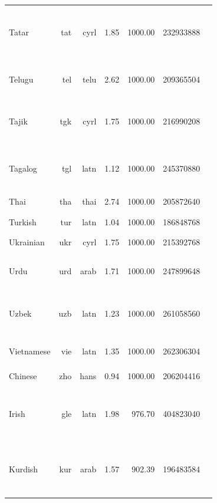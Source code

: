 \documentclass[11pt]{article}
\begin{document}
\begin{center}
\begin{longtable}[width=0.9\textwidth]{|lrrrrrl|}
Tatar & tat & cyrl & 1.85 & 1000.00 & 232933888 & {\color{oscar}\rule{0.4cm}{8pt}}{\color{nllb}\rule{0.49cm}{8pt}}{\color{madlad400}\rule{1.72cm}{8pt}}{\color{glot500}\rule{1.14cm}{8pt}}{\color{other}\rule{0.25cm}{8pt}} \\ 
Telugu & tel & telu & 2.62 & 1000.00 & 209365504 & {\color{oscar}\rule{0.74cm}{8pt}}{\color{glot500}\rule{3.24cm}{8pt}}{\color{other}\rule{0.019999999999999574cm}{8pt}} \\ 
Tajik & tgk & cyrl & 1.75 & 1000.00 & 216990208 & {\color{oscar}\rule{0.38cm}{8pt}}{\color{nllb}\rule{0.53cm}{8pt}}{\color{madlad400}\rule{2.99cm}{8pt}}{\color{other}\rule{0.09999999999999964cm}{8pt}} \\ 
Tagalog & tgl & latn & 1.12 & 1000.00 & 245370880 & {\color{oscar}\rule{0.9cm}{8pt}}{\color{nllb}\rule{1.07cm}{8pt}}{\color{glot500}\rule{2.01cm}{8pt}}{\color{other}\rule{0.020000000000000018cm}{8pt}} \\ 
Thai & tha & thai & 2.74 & 1000.00 & 205872640 & {\color{oscar}\rule{4.0cm}{8pt}}{\color{other}\rule{0.0cm}{8pt}} \\ 
Turkish & tur & latn & 1.04 & 1000.00 & 186848768 & {\color{oscar}\rule{4.0cm}{8pt}}{\color{other}\rule{0.0cm}{8pt}} \\ 
Ukrainian & ukr & cyrl & 1.75 & 1000.00 & 215392768 & {\color{oscar}\rule{4.0cm}{8pt}}{\color{other}\rule{0.0cm}{8pt}} \\ 
Urdu & urd & arab & 1.71 & 1000.00 & 247899648 & {\color{oscar}\rule{1.43cm}{8pt}}{\color{nllb}\rule{1.52cm}{8pt}}{\color{glot500}\rule{1.05cm}{8pt}}{\color{other}\rule{0.0cm}{8pt}} \\ 
Uzbek & uzb & latn & 1.23 & 1000.00 & 261058560 & {\color{oscar}\rule{0.03cm}{8pt}}{\color{madlad400}\rule{3.06cm}{8pt}}{\color{glot500}\rule{0.62cm}{8pt}}{\color{other}\rule{0.29000000000000004cm}{8pt}} \\ 
Vietnamese & vie & latn & 1.35 & 1000.00 & 262306304 & {\color{oscar}\rule{3.99cm}{8pt}}{\color{other}\rule{0.009999999999999787cm}{8pt}} \\ 
Chinese & zho & hans & 0.94 & 1000.00 & 206204416 & {\color{oscar}\rule{4.0cm}{8pt}} \\ 
Irish & gle & latn & 1.98 & 976.70 & 404823040 & {\color{oscar}\rule{0.09cm}{8pt}}{\color{nllb}\rule{0.23cm}{8pt}}{\color{madlad400}\rule{1.91cm}{8pt}}{\color{glot500}\rule{1.73cm}{8pt}}{\color{other}\rule{0.040000000000000036cm}{8pt}} \\ 
Kurdish & kur & arab & 1.57 & 902.39 & 196483584 & {\color{oscar}\rule{0.6cm}{8pt}}{\color{nllb}\rule{0.76cm}{8pt}}{\color{madlad400}\rule{1.73cm}{8pt}}{\color{glot500}\rule{0.77cm}{8pt}}{\color{other}\rule{0.14000000000000012cm}{8pt}} \\ 

\end{longtable}
\end{center}
\end{document}
